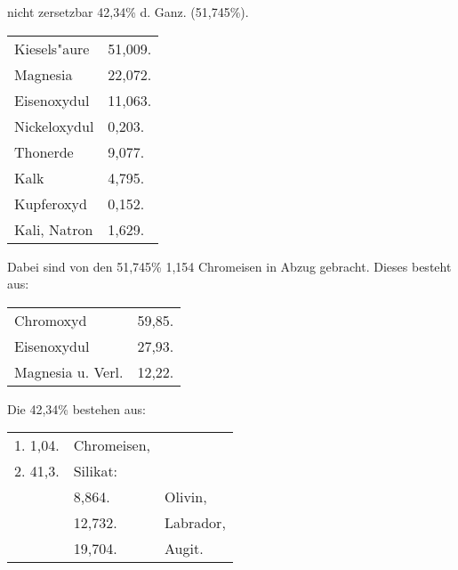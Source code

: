 \documentclass[a4paper, 11pt, oneside]{article}
\begin{document}
\begin{center}
nicht zersetzbar 42,34\% d. Ganz. (51,745\%).
\end{center}

\begin{table}[H]
    \centering
    \begin{tabular}{l l}
        \hline
        Kiesels"aure & 51,009. \\
        Magnesia & 22,072. \\
        Eisenoxydul & 11,063. \\
        Nickeloxydul & 0,203. \\
        Thonerde & 9,077. \\
        Kalk & 4,795. \\
        Kupferoxyd & 0,152. \\
        Kali, Natron & 1,629. \\
    \end{tabular}
\end{table}

\begin{center}
Dabei sind von den 51,745\% 1,154 Chromeisen in Abzug gebracht. Dieses besteht aus:
\end{center}

\begin{table}[H]
    \centering
    \begin{tabular}{l l}
        Chromoxyd & 59,85. \\
        Eisenoxydul & 27,93. \\
        Magnesia u. Verl. & 12,22. \\
    \end{tabular}
\end{table}

\begin{center}
Die 42,34\% bestehen aus:
\end{center}

\begin{table}[H]
    \centering
    \begin{tabular}{l l l}
        1. 1,04. & Chromeisen, & \\
        2. 41,3. & Silikat: & \\
         & 8,864. & Olivin, \\
         & 12,732. & Labrador, \\
         & 19,704. & Augit. \\
    \end{tabular}
\end{table}
\end{document}
